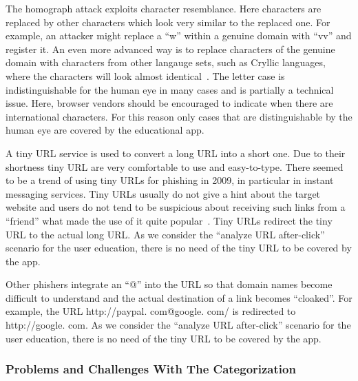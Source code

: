 \begin{description}[leftmargin=0cm]
	\item[Homograph Attack] The homograph attack exploits character resemblance.
 Here characters are replaced by other characters which look very similar to the replaced one.
 For example, an attacker might replace a ``w'' within a genuine domain with ``vv'' and register it.
 An even more advanced way is to replace characters of the genuine domain with characters from other langauge sets, such as Cryllic languages, where the characters will look almost identical~\cite{gabrilovich2002homograph}. The letter case is indistinguishable for the human eye in many cases and is partially a technical issue.
Here, browser vendors should be encouraged to indicate when there are international characters.
 For this reason only cases that are distinguishable by the human eye are covered by the educational app.

	\item[Tiny URLs] A tiny URL service is used to convert a long URL into a short one.
 Due to their shortness tiny URL are very comfortable to use and easy-to-type.
 There seemed to be a trend of using tiny URLs for phishing in 2009, in particular in instant messaging services.
 Tiny URLs usually do not give a hint about the target website and users do not tend to be suspicious about receiving such links from a ``friend'' what made the use of it quite popular~\cite{tinyurlpcworld}. Tiny URLs redirect the tiny URL to the actual long URL.
 As we consider the ``analyze URL after-click'' scenario for the user education, there is no need of the tiny URL to be covered by the app.

		\item[Cloaked URLs] Other phishers integrate an ``@'' into the URL so that domain names become difficult to understand and the actual destination of a link becomes ``cloaked''\cite{alnajim2009fighting}. For example, the URL http://paypal.
com@google.
com/ is redirected to http://google.
com.
 As we consider the ``analyze URL after-click'' scenario for the user education, there is no need of the tiny URL to be covered by the app.

\end{description}

\subsubsection{Problems and Challenges With The Categorization}

